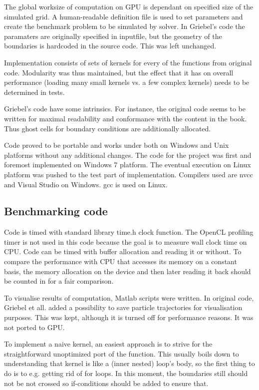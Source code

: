 The global worksize of computation on GPU is dependant on specified size of the simulated grid. A human-readable definition file is used to set parameters and create the benchmark problem to be simulated by solver. In Griebel's code the paramaters are originally specified in inputfile, but the geometry of the boundaries is hardcoded in the source code. This was left unchanged.

Implementation consists of sets of kernels for every of the functions from original code. Modularity was thus maintained, but the effect that it has on overall performance (loading many small kernels vs. a few complex kernels) needs to be determined in tests.

Griebel's code have some intrinsics. For instance, the original code seems to be written for maximal readability and conformance with the content in the book. Thus ghost cells for boundary conditions are additionally allocated.

Code proved to be portable and works under both on Windows and Unix platforms without any additional changes. The code for the project was first and foremost implemented on Windows 7 platform. The eventual execution on Linux platform was pushed to the test part of implementation. Compilers used are nvcc and Visual Studio on Windows. gcc is used on Linux.



\subsection{Benchmarking code}
Code is timed with standard library time.h clock function. The OpenCL profiling timer is not used in this code because the goal is to measure wall clock time on CPU. Code can be timed with buffer allocation and reading it or without. To compare the performance with CPU that accesses its memory on a constant basis, the memory allocation on the device and then later reading it back should be counted in for a fair comparison.

To visualise results of computation, Matlab scripts were written. In original code, Griebel et all. added a possibility to save particle trajectories for visualisation purposes. This was kept, although it is turned off for performance reasons. It was not ported to GPU.

To implement a naive kernel, an easiest approach is to strive for the straightforward unoptimized port of the function. This usually boils down to understanding that kernel is like a (inner nested) loop's body, so the first thing to do is to e.g. getting rid of for loops. In this moment, the boundaries still should not be not crossed so if-conditions should be added to ensure that.

